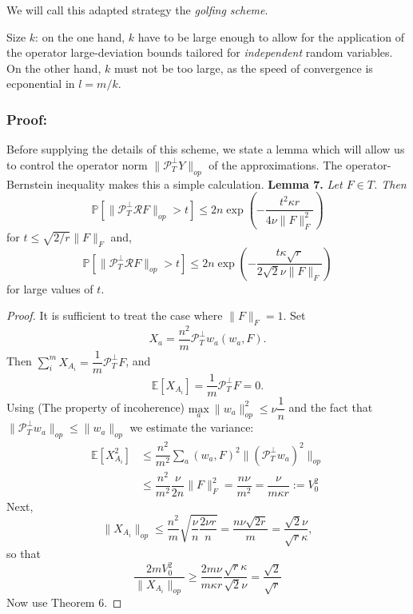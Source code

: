 \documentclass{article}
\begin{document}
We will call this adapted strategy the {\color{red}\textit{golfing scheme}}.

Size $k$: on the one hand, $k$ have to be large enough to allow for the application of the operator large-deviation bounds tailored for \textit{independent} random variables. On the other hand, $k$ must not be too large, as the speed of convergence is ecponential in $l = m/k$.

\subsubsection{Proof:}Before supplying the details of this scheme, we state a lemma which will allow us to control the operator norm $\|\mathcal{P}_T^\perp Y\|_{op}$ of the approximations. The operator-Bernstein inequality makes this a simple calculation.
\textbf{Lemma 7.} \textit{Let $F\in T$. Then}
\[
\mathbb{P}\left[ \| \mathcal{P}_T^\perp \mathcal{R}F\|_{op} > t\right] \le 2n \exp \left( -\dfrac{t^2\kappa r}{4\nu \|F\|_F^2}\right)
\]
for $t \le \sqrt{2/r}\|F\|_F$ and,
\[
\mathbb{P}\left[ \| \mathcal{P}_T^\perp \mathcal{R}F\|_{op} > t\right] \le 2n \exp \left( -\dfrac{t\kappa \sqrt{r}}{2\sqrt{2}\nu \|F\|_F}\right)
\]
for large values of $t$.

\begin{proof}
It is sufficient to treat the case where $\|F\|_F=1$. Set
\[
X_a = \dfrac{n^2}{m}\mathcal{P}_T^\perp w_a(w_a,F).
\]
Then $\sum_i^m X_{A_i} = \dfrac{1}{m}\mathcal{P}_T^\perp F$, and
\[
\mathbb{E}[X_{A_i}] =  \dfrac{1}{m}\mathcal{P}_T^\perp F=0.
\]
Using {\color{red}(The property of incoherence)} $\underset{a} {\mathrm{max}} ~\|w_a\|_{op}^2 \le \nu \dfrac{1}{n}$ and the fact that $\|\mathcal{P}_T^\perp w_a\|_{op} \le \|w_a\|_{op}$ we estimate the variance:
\begin{equation}
\begin{aligned}
\mathbb{E}[X_{A_i}^2] & \le \dfrac{n^2}{m^2}\sum_a(w_a,F)^2\|(\mathcal{P}_T^\perp w_a)^2\|_{op} \\
& \le \dfrac{n^2}{m^2}\dfrac{\nu}{2n}\|F\|_F^2 = \dfrac{n\nu}{m^2} = \dfrac{\nu}{m\kappa r} := V_0^2
\end{aligned}
\label{eq:37}
\end{equation}
Next,
\[
\|X_{A_i}\|_{op} \le \dfrac{n^2}{m}\sqrt{\dfrac{\nu}{n}\dfrac{2\nu r}{n}}=\dfrac{n\nu \sqrt{2r}}{m} = \dfrac{\sqrt{2}\nu}{\sqrt{r}\kappa},
\]
so that
\[
\dfrac{2mV_0^2}{\|X_{A_i}\|_{op}}\ge \dfrac{2m\nu}{m\kappa r}\dfrac{\sqrt{r} \kappa}{\sqrt{2}\nu} = \dfrac{\sqrt{2}}{\sqrt{r}}
\]
Now use Theorem 6.
\end{proof}
\end{document}
